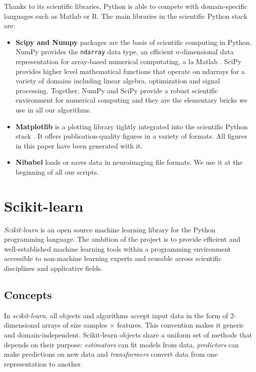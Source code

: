 \documentclass{frontiersSCNS} %
\begin{document}
Thanks to its scientific libraries, Python is able to compete with domain-specific
languages such as Matlab or R. The main libraries in the scientific Python stack are:
\begin{itemize}
    \item{\bf Scipy and Numpy} packages are the basis of scientific computing in Python.
        NumPy provides the \verb!ndarray! data type, an efficient $n$-dimensional data
        representation for array-based numerical computating, a la Matlab
        \citep{vanderwalt2011}.
        SciPy provides higher level mathematical functions that operate on ndarrays for
        a variety of domains including linear algebra, optimization and signal
        processing. Together, NumPy and SciPy provide a robust scientific environment
        for numerical computing and they are the elementary bricks we use in all our
        algorithms.

    \item{\bf Matplotlib} is a plotting library tightly integrated into the
        scientific Python stack \citep{hunter2007}. It offers publication-quality figures in
        a variety of formats.
        All figures in this paper have been generated with it.

    \item{\bf Nibabel} loads or saves data in neuroimaging file formats.
	We use it at the beginning of all our scripts.
\end{itemize}

\section{Scikit-learn}
\label{scikitlearn}

{\em Scikit-learn} \citep{pedregosa2011} is an open source machine
learning library for the Python programming language. The ambition of the
project is to provide efficient and well-established machine learning tools within
a programming environment accessible to non-machine learning experts
and reusable across scientific disciplines and applicative fields.

\subsection{Concepts}

In {\em scikit-learn}, all objects and algorithms accept input data in the form of
2-dimensional arrays of size samples $\times$ features.
This convention makes it generic and domain-independent.
Scikit-learn objects share a uniform set of methods that
depends on their purpose: \textit{estimators} can fit models from data,
\textit{predictors} can make predictions on new data and \textit{transformers}
convert data from one representation to another.
\end{document}

